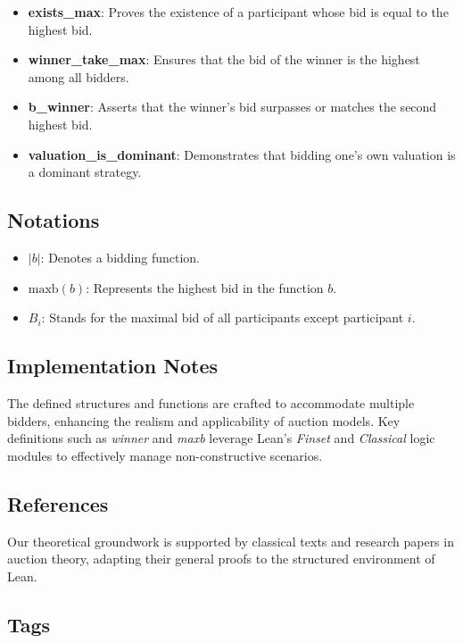 \begin{itemize}
    \item \textbf{exists\_max}: Proves the existence of a participant whose bid is equal to the highest bid.
    \item \textbf{winner\_take\_max}: Ensures that the bid of the winner is the highest among all bidders.
    \item \textbf{b\_winner}: Asserts that the winner's bid surpasses or matches the second highest bid.
    \item \textbf{valuation\_is\_dominant}: Demonstrates that bidding one's own valuation is a dominant strategy.
\end{itemize}

\subsection{Notations}

\begin{itemize}
    \item \( |b| \): Denotes a bidding function.
    \item \( \text{maxb}(b) \): Represents the highest bid in the function \( b \).
    \item \( B_i \): Stands for the maximal bid of all participants except participant \( i \).
\end{itemize}

\subsection{Implementation Notes}

The defined structures and functions are crafted to accommodate multiple bidders, enhancing the realism and applicability of auction models. Key definitions such as \textit{winner} and \textit{maxb} leverage Lean's \textit{Finset} and \textit{Classical} logic modules to effectively manage non-constructive scenarios.

\subsection{References}

Our theoretical groundwork is supported by classical texts and research papers in auction theory, adapting their general proofs to the structured environment of Lean.

\subsection{Tags}

